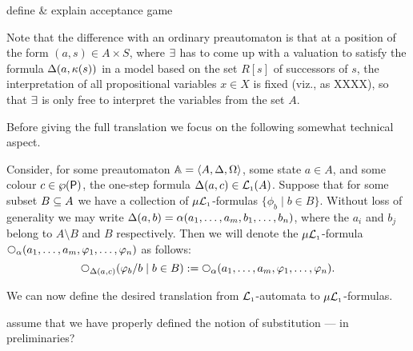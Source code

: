 \btbs
\item
define \& explain acceptance game
\item
Note that the difference with an ordinary preautomaton is that at a position of 
the form $(a,s) \in A \times S$, where $\exists$ has to come up with a valuation 
to satisfy the formula $\Delta(a,\kappa(s))$ in a model based on the set $R[s]$ of
successors of $s$, the interpretation of all propositional variables $x \in X$ 
is fixed (viz., as XXXX), so that $\exists$ is only free to interpret the 
variables from the set $A$.
\etbs

Before giving the full translation we focus on the following somewhat technical
aspect.

\begin{definition}
Consider, for some preautomaton $\mathbb{A} = \langle{A,\Delta,\Omega}\rangle$, some state $a \in
A$, and some colour $c \in \wp(\mathsf{P})$, the one-step formula $\Delta(a,c)\in 
\mathcal{L}_{\scriptscriptstyle 1}(A)$.
Suppose that for some subset $B \subseteq A$ we have a collection of 
$\mu\mathcal{L}_{\scriptscriptstyle 1}$-formulas $\{ \phi_{b} \mid b \in B \}$.
Without loss of generality we may write $\Delta(a,b) = 
\alpha(a_{1},\ldots,a_{m},b_{1},\ldots,b_{n})$, where the $a_{i}$ and $b_{j}$ 
belong to $A\setminus B$ and $B$ respectively.
Then we will denote the $\mu\mathcal{L}_{\scriptscriptstyle 1}$-formula 
$\nxt{\al}(a_{1},\ldots,a_{m},\phi_{1},\ldots,\phi_{n})$ as follows:
\[
\nxt{\tmap(a,c)}(\phi_{b}/b \mid b \in B)
\isdef \nxt{\al}(a_{1},\ldots,a_{m},\phi_{1},\ldots,\phi_{n}).
\]
\end{definition}

\noindent
We can now define the desired translation from $\mathcal{L}_{\scriptscriptstyle 1}$-automata to 
$\mu\mathcal{L}_{\scriptscriptstyle 1}$-formulas.

\btbs
\item
assume that we have properly defined the notion of substitution --- 
in preliminaries?
\etbs

